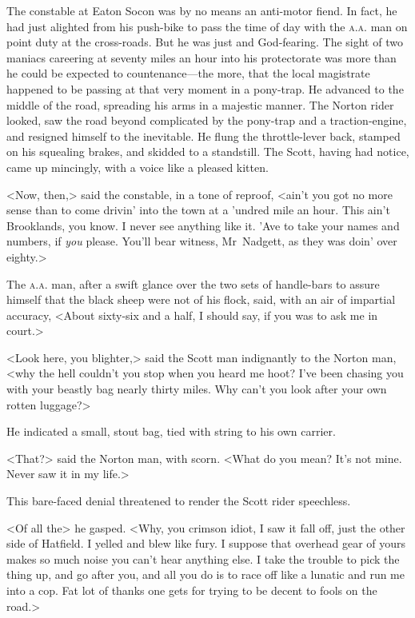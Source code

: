 The constable at Eaton Socon was by no means an anti-motor fiend. In fact, he had just alighted from his push-bike to pass the time of day with the \textsc{a.a.} man on point duty at the cross-roads. But he was just and God-fearing. The sight of two maniacs careering at seventy miles an hour into his protectorate was more than he could be expected to countenance—the more, that the local magistrate happened to be passing at that very moment in a pony-trap. He advanced to the middle of the road, spreading his arms in a majestic manner. The Norton rider looked, saw the road beyond complicated by the pony-trap and a traction-engine, and resigned himself to the inevitable. He flung the throttle-lever back, stamped on his squealing brakes, and skidded to a standstill. The Scott, having had notice, came up mincingly, with a voice like a pleased kitten.

<Now, then,> said the constable, in a tone of reproof, <ain't you got no more sense than to come drivin' into the town at a 'undred mile an hour. This ain't Brooklands, you know. I never see anything like it. 'Ave to take your names and numbers, if \emph{you} please. You'll bear witness, Mr~Nadgett, as they was doin' over eighty.>

The \textsc{a.a.} man, after a swift glance over the two sets of handle-bars to assure himself that the black sheep were not of his flock, said, with an air of impartial accuracy, <About sixty-six and a half, I should say, if you was to ask me in court.>

<Look here, you blighter,> said the Scott man indignantly to the Norton man, <why the hell couldn't you stop when you heard me hoot? I've been chasing you with your beastly bag nearly thirty miles. Why can't you look after your own rotten luggage?>

He indicated a small, stout bag, tied with string to his own carrier.

<That?> said the Norton man, with scorn. <What do you mean? It's not mine. Never saw it in my life.>

This bare-faced denial threatened to render the Scott rider speechless.

<Of all the\longdash> he gasped. <Why, you crimson idiot, I saw it fall off, just the other side of Hatfield. I yelled and blew like fury. I suppose that overhead gear of yours makes so much noise you can't hear anything else. I take the trouble to pick the thing up, and go after you, and all you do is to race off like a lunatic and run me into a cop. Fat lot of thanks one gets for trying to be decent to fools on the road.>

